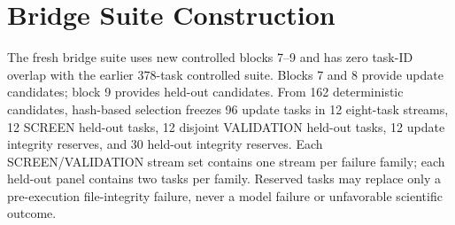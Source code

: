 \section{Bridge Suite Construction}
\label{app:suite}

The fresh bridge suite uses new controlled blocks 7--9 and has zero task-ID overlap with the earlier 378-task controlled suite. Blocks 7 and 8 provide update candidates; block 9 provides held-out candidates. From 162 deterministic candidates, hash-based selection freezes 96 update tasks in 12 eight-task streams, 12 SCREEN held-out tasks, 12 disjoint VALIDATION held-out tasks, 12 update integrity reserves, and 30 held-out integrity reserves. Each SCREEN/VALIDATION stream set contains one stream per failure family; each held-out panel contains two tasks per family. Reserved tasks may replace only a pre-execution file-integrity failure, never a model failure or unfavorable scientific outcome.
